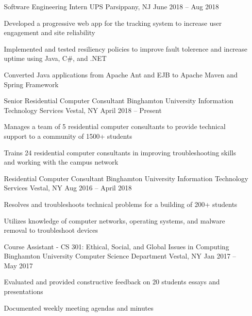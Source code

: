 \documentclass[]{awesome-cv}
\begin{document}
\begin{cventries}
	\cventry
    {Software Engineering Intern}
	{UPS}
	{Parsippany, NJ}
	{June 2018 – Aug 2018}
	{\begin{cvitems}
		\item {Developed a progressive web app for the tracking system to increase user engagement and site reliability}
		\item {Implemented and tested resiliency policies to improve fault tolerence and increase uptime using Java, C\#, and .NET}
		\item {Converted Java applications from Apache Ant and EJB to Apache Maven and Spring Framework}
	\end{cvitems}}
	\cventry
	{Senior Residential Computer Consultant}
	{Binghamton University Information Technology Services}
	{Vestal, NY}
	{April 2018 – Present}
	{\begin{cvitems}
		\item {Manages a team of 5 residential computer consultants to provide technical support to a community of 1500+ students}
		\item {Trains 24 residential computer consultants in improving troubleshooting skills and working with the campus network}
	\end{cvitems}}
	\cventry
	{Residential Computer Consultant}
	{Binghamton University Information Technology Services}
	{Vestal, NY}
	{Aug 2016 – April 2018}
	{\begin{cvitems}
		\item {Resolves and troubleshoots technical problems for a building of 200+ students}
		\item {Utilizes knowledge of computer networks, operating systems, and malware removal to troubleshoot devices}
	\end{cvitems}}
	\cventry
	{Course Assistant - CS 301: Ethical, Social, and Global Issues in Computing}
	{Binghamton University Computer Science Department}
	{Vestal, NY}
	{Jan 2017 – May 2017}
	{\begin{cvitems}
		\item {Evaluated and provided constructive feedback on 20 students\textquotesingle{} essays and presentations}
		\item {Documented weekly meeting agendas and minutes}
	\end{cvitems}}
\end{cventries}
\vspace{-2mm}
\end{document}
